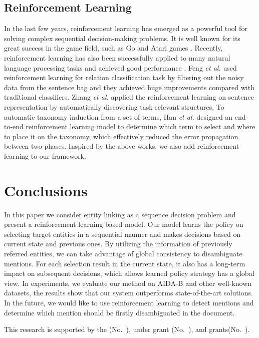 \documentclass[sigconf]{acmart}
\begin{document}
\subsection{Reinforcement Learning}
In the last few years, reinforcement learning has emerged as a powerful tool for solving complex sequential decision-making problems. It is well known for its great success in the game field, such as Go \cite{SilverHMGSDSAPL16} and Atari games \cite{MnihKSRVBGRFOPB15}. Recently, reinforcement learning has also been successfully applied to many natural language processing tasks and achieved good performance \cite{XiongHW17,LiuWZYZ18,FengHZYZ18}. Feng \emph{et al.}\cite{FengHZYZ18} used reinforcement learning for relation classification task by filtering out the noisy data from the sentence bag and they achieved huge improvements compared with traditional classifiers. Zhang \emph{et al.} \cite{ZhangHZ18} applied the reinforcement learning on sentence representation by automatically discovering task-relevant structures. To automatic taxonomy induction from a set of terms, Han \emph{et al.} \cite{HanRSMG18} designed an end-to-end reinforcement learning model to determine which term to select and where to place it on the taxonomy, which effectively reduced the error propagation between two phases. Inspired by the above works, we also add reinforcement learning to our framework.

\section{Conclusions}
In this paper we consider entity linking as a sequence decision problem and  present a reinforcement learning based model. Our model learns the policy on selecting target entities in a sequential manner and makes decisions based on current state and previous ones. By utilizing the information of previously referred entities, we can take advantage of global consistency to disambiguate mentions. For each selection result in the current state, it also has a long-term impact on subsequent decisions, which allows learned policy strategy has a global view. In experiments, we evaluate our method on AIDA-B and other well-known datasets, the results show that our system outperforms state-of-the-art solutions. In the future, we would like to use reinforcement learning to detect mentions and determine which mention should be firstly disambiguated in the document. 


\begin{acks}


This research is supported by the (No.~),   under grant (No.~), and  grants(No.~).
\end{acks}



\end{document}
